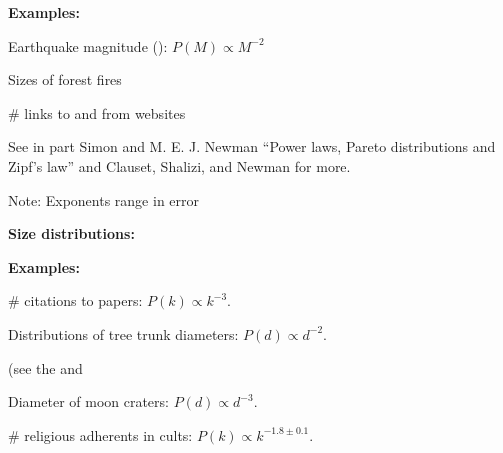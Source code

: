   \textbf{Examples:}
    
     
      Earthquake magnitude ():\cite{gutenberg1942a,bak2002a} $P(M) \propto M^{-2}$
     
     
      Sizes of forest fires\cite{grassberger2002a}
     
     
      \# links to and from websites\cite{barabasi1999a}
    
  

  
    
     
      See in part Simon\cite{simon1955a} and 
      M. E. J. Newman\cite{newman2005b}
      ``Power laws, Pareto distributions and Zipf's law''
      and Clauset, Shalizi, and Newman\cite{clauset2009b} for more.
     
      Note: Exponents range in error
    
  



  \textbf{Size distributions:}

  \textbf{Examples:}
    
     
      \# citations to papers:\cite{price1965a,price1976a} $P(k) \propto k^{-3}$.
     
     
      Distributions of tree trunk diameters: $P(d) \propto d^{-2}$.
     
      (see the 
      and 
     
      Diameter of moon craters:\cite{newman2005b} $P(d) \propto d^{-3}$.
     
     
      \# religious adherents in cults:\cite{clauset2009b} 
      $P(k) \propto k^{-1.8 \pm 0.1}.$
    
    
